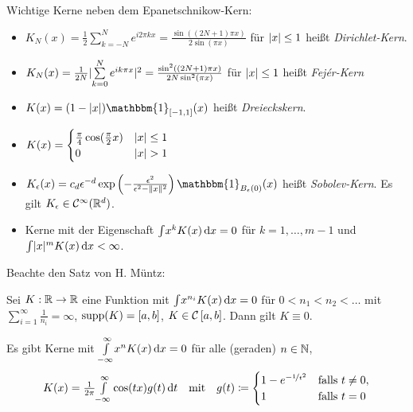 \documentclass{cheat-sheet}
\newcommand{\ind}{\mathbbm{1}} %
\newcommand{\Cont}{\mathcal{C}} %
\begin{document}
\begin{bem}
  Wichtige Kerne neben dem Epanetschnikow-Kern:
  \begin{itemize}
    \item $K_N(x) = \tfrac{1}{2} \sum_{k=-N}^N e^{i 2 \pi k x} = \tfrac{\sin((2 N + 1) \pi x)}{2 \sin (\pi x)}$ für $\lvert x\rvert \leq 1$ heißt \emph{Dirichlet-Kern}.
    \item $K_N(x) = \tfrac{1}{2 N} \abs{\sum_{k=0}^N e^{i k \pi x}}^2 = \tfrac{\sin^2((2 N + 1) \pi x)}{2 N \sin^2(\pi x)}$ für $\lvert x\rvert \leq 1$ heißt \emph{Fejér-Kern}
    \item $K(x) = (1 - \abs{x}) \ind_{\cinterval{-1}{1}}(x)$ heißt \emph{Dreieckskern}.
    \item $K(x) = \begin{cases}
      \tfrac{\pi}{4} \cos(\tfrac{\pi}{2} x) & \lvert x\rvert \leq 1 \\
      0 & \lvert x\rvert > 1
    \end{cases}$
    \item $K_\epsilon(x) = c_d \epsilon^{-d} \exp \left( - \tfrac{\epsilon^2}{\epsilon^2 - \norm{x}^2} \right) \ind_{B_\epsilon(0)}(x)$ heißt \emph{Sobolev-Kern}.
    Es gilt $K_\epsilon \in \Cont^\infty(\R^d)$.
    \item Kerne mit der Eigenschaft ${\textstyle \int} x^k K(x) \,\mathrm{d} x = 0$ für $k = 1, \ldots, m - 1$ und ${\textstyle \int} \lvert x\rvert^m K(x) \,\mathrm{d} x < \infty$.
  \end{itemize}
\end{bem}

\begin{bem}
  Beachte den Satz von H. Müntz:

  Sei $K : \mathbb{R} \to \mathbb{R}$ eine Funktion mit ${\textstyle \int} x^{n_i} K(x) \,\mathrm{d} x = 0$ für $0 < n_1 < n_2 < \ldots$ mit $\sum_{i=1}^\infty \tfrac{1}{n_i} = \infty$, $\operatorname{supp}(K) = \left[ a, b \right]$, $K \in \Cont \cinterval{a}{b}$. Dann gilt $K \equiv 0$.
\end{bem}

\begin{bem}
  Es gibt Kerne mit ${\textstyle \int\limits_{-\infty}^{\infty}} x^n K(x) \,\mathrm{d} x = 0$ für alle (geraden) $n \in \mathbb{N}$, \zB{}
  \[
    K(x) = \tfrac{1}{2 \pi} {\textstyle \int\limits_{- \infty}^{\infty}} \cos(t x) g(t) \,\mathrm{d} t
    \quad \text{mit} \quad
    g(t) \coloneqq \begin{cases}
      1 - e^{- \nicefrac{1}{t^2}} & \text{falls } t \neq 0, \\
      1 & \text{falls } t = 0
    \end{cases}
  \]
\end{bem}
\end{document}
